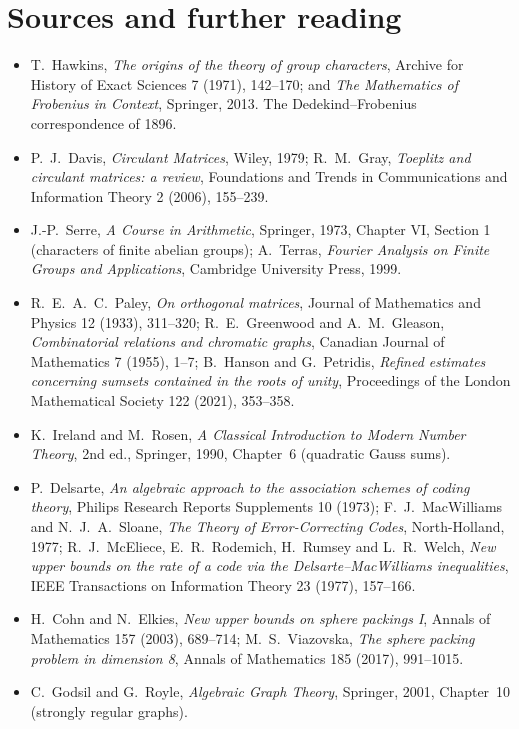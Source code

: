 \section*{Sources and further reading}

\begin{itemize}
\item T.~Hawkins, \emph{The origins of the theory of group characters}, Archive for History of Exact Sciences 7 (1971), 142--170; and
\emph{The Mathematics of Frobenius in Context}, Springer, 2013. The Dedekind--Frobenius correspondence of 1896.
\item P.~J.~Davis, \emph{Circulant Matrices}, Wiley, 1979; R.~M.~Gray, \emph{Toeplitz and circulant matrices: a review}, Foundations and
Trends in Communications and Information Theory 2 (2006), 155--239.
\item J.-P.~Serre, \emph{A Course in Arithmetic}, Springer, 1973, Chapter VI, Section 1 (characters of finite abelian groups); A.~Terras,
\emph{Fourier Analysis on Finite Groups and Applications}, Cambridge University Press, 1999.
\item R.~E.~A.~C.~Paley, \emph{On orthogonal matrices}, Journal of Mathematics and Physics 12 (1933), 311--320; R.~E.~Greenwood and
A.~M.~Gleason, \emph{Combinatorial relations and chromatic graphs}, Canadian Journal of Mathematics 7 (1955), 1--7; B.~Hanson and
G.~Petridis, \emph{Refined estimates concerning sumsets contained in the roots of unity}, Proceedings of the London Mathematical
Society 122 (2021), 353--358.
\item K.~Ireland and M.~Rosen, \emph{A Classical Introduction to Modern Number Theory}, 2nd ed., Springer, 1990, Chapter~6 (quadratic Gauss sums).
\item P.~Delsarte, \emph{An algebraic approach to the association schemes of coding theory}, Philips Research Reports Supplements 10
(1973); F.~J.~MacWilliams and N.~J.~A.~Sloane, \emph{The Theory of Error-Correcting Codes}, North-Holland, 1977;
R.~J.~McEliece, E.~R.~Rodemich, H.~Rumsey and L.~R.~Welch, \emph{New upper bounds on the rate of a code via the Delsarte--MacWilliams
inequalities}, IEEE Transactions on Information Theory 23 (1977), 157--166.
\item H.~Cohn and N.~Elkies, \emph{New upper bounds on sphere packings I}, Annals of Mathematics 157 (2003), 689--714; M.~S.~Viazovska,
\emph{The sphere packing problem in dimension 8}, Annals of Mathematics 185 (2017), 991--1015.
\item C.~Godsil and G.~Royle, \emph{Algebraic Graph Theory}, Springer, 2001, Chapter~10 (strongly regular graphs).
\end{itemize}
